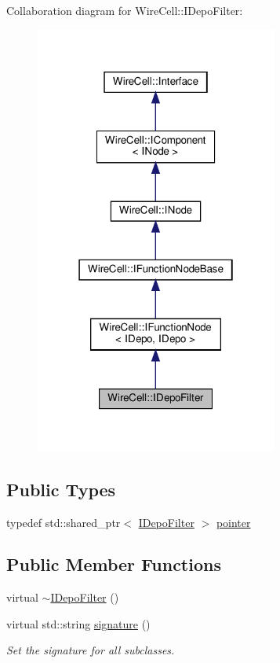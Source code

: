 Collaboration diagram for Wire\+Cell\+:\+:I\+Depo\+Filter\+:
\nopagebreak
\begin{figure}[H]
\begin{center}
\leavevmode
\includegraphics[width=226pt]{class_wire_cell_1_1_i_depo_filter__coll__graph}
\end{center}
\end{figure}
\subsection*{Public Types}
\begin{DoxyCompactItemize}
\item 
typedef std\+::shared\+\_\+ptr$<$ \hyperlink{class_wire_cell_1_1_i_depo_filter}{I\+Depo\+Filter} $>$ \hyperlink{class_wire_cell_1_1_i_depo_filter_aef40b27718702971536c72b9b02b943b}{pointer}
\end{DoxyCompactItemize}
\subsection*{Public Member Functions}
\begin{DoxyCompactItemize}
\item 
virtual \hyperlink{class_wire_cell_1_1_i_depo_filter_aa33c0efb0774424d1020625cf757c2a2}{$\sim$\+I\+Depo\+Filter} ()
\item 
virtual std\+::string \hyperlink{class_wire_cell_1_1_i_depo_filter_a308041810acd84cc212497121c17ac02}{signature} ()
\begin{DoxyCompactList}\small\item\em Set the signature for all subclasses. \end{DoxyCompactList}\end{DoxyCompactItemize}


